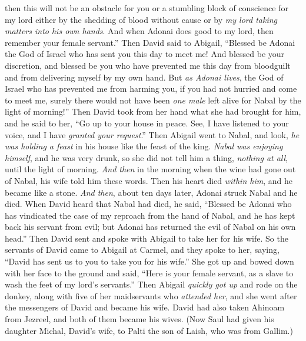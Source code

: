 \begin{biblechapter}
\verse then this will not be an obstacle for you or a stumbling block of conscience for my lord either by the shedding of blood without cause or by \textit{my lord taking matters into his own hands}. And when Adonai does good to my lord, then remember your female servant.”
\verse Then David said to Abigail, “Blessed be Adonai the God of Israel who has sent you this day to meet me!
\verse And blessed be your discretion, and blessed be you who have prevented me this day from bloodguilt and from delivering myself by my own hand.
\verse But \textit{as Adonai lives}, the God of Israel who has prevented me from harming you, if you had not hurried and come to meet me, surely there would not have been \textit{one male} left alive for Nabal by the light of morning!”
\verse Then David took from her hand what she had brought for him, and he said to her, “Go up to your house in peace. See, I have listened to your voice, and I have \textit{granted your request}.”
\verse Then Abigail went to Nabal, and look, \textit{he was holding a feast} in his house like the feast of the king. \textit{Nabal was enjoying himself}, and he was very drunk, so she did not tell him a thing, \textit{nothing at all}, until the light of morning.
\verse \textit{And then} in the morning when the wine had gone out of Nabal, his wife told him these words. Then his heart died \textit{within him}, and he became like a stone.
\verse \textit{And then}, about ten days later, Adonai struck Nabal and he died.
\verse When David heard that Nabal had died, he said, “Blessed be Adonai who has vindicated the case of my reproach from the hand of Nabal, and he has kept back his servant from evil; but Adonai has returned the evil of Nabal on his own head.” Then David sent and spoke with Abigail to take her for his wife.
\verse So the servants of David came to Abigail at Carmel, and they spoke to her, saying, “David has sent us to you to take you for his wife.”
\verse She got up and bowed down with her face to the ground and said, “Here is your female servant, as a slave to wash the feet of my lord’s servants.”
\verse Then Abigail \textit{quickly got up} and rode on the donkey, along with five of her maidservants who \textit{attended her}, and she went after the messengers of David and became his wife.
\verse David had also taken Ahinoam from Jezreel, and both of them became his wives.
\verse (Now Saul had given his daughter Michal, David’s wife, to Palti the son of Laish, who was from Gallim.)
\end{biblechapter}

